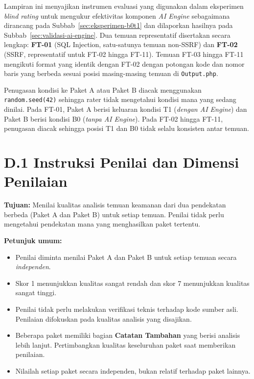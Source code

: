 {}
\label{app:blind-rating}

Lampiran ini menyajikan instrumen evaluasi yang digunakan dalam
eksperimen \textit{blind rating} untuk mengukur efektivitas komponen
\textit{AI Engine} sebagaimana dirancang pada
Subbab~\ref{sec:eksperimen-b0t1} dan dilaporkan hasilnya pada
Subbab~\ref{sec:validasi-ai-engine}. Dua temuan representatif
disertakan secara lengkap: \textbf{FT-01} (SQL Injection,
satu-satunya temuan non-SSRF) dan \textbf{FT-02} (SSRF, representatif
untuk FT-02 hingga FT-11). Temuan FT-03 hingga FT-11 mengikuti format
yang identik dengan FT-02 dengan potongan kode dan nomor baris yang
berbeda sesuai posisi masing-masing temuan di \texttt{Output.php}.

Penugasan kondisi ke Paket A atau Paket B diacak menggunakan
\texttt{random.seed(42)} sehingga rater tidak mengetahui kondisi mana
yang sedang dinilai. Pada FT-01, Paket A berisi keluaran kondisi T1
(\textit{dengan AI Engine}) dan Paket B berisi kondisi B0
(\textit{tanpa AI Engine}). Pada FT-02 hingga FT-11, penugasan
diacak sehingga posisi T1 dan B0 tidak selalu konsisten antar temuan.

\section*{D.1 Instruksi Penilai dan Dimensi Penilaian}

\textbf{Tujuan:} Menilai kualitas analisis temuan keamanan dari dua
pendekatan berbeda (Paket A dan Paket B) untuk setiap temuan.
Penilai tidak perlu mengetahui pendekatan mana yang menghasilkan
paket tertentu.

\textbf{Petunjuk umum:}
\begin{itemize}
  \item Penilai diminta menilai Paket A dan Paket B untuk setiap
  temuan secara \emph{independen}.
  \item Skor 1 menunjukkan kualitas sangat rendah dan skor 7
  menunjukkan kualitas sangat tinggi.
  \item Penilai tidak perlu melakukan verifikasi teknis terhadap
  kode sumber asli. Penilaian difokuskan pada kualitas analisis
  yang disajikan.
  \item Beberapa paket memiliki bagian \textbf{Catatan Tambahan}
  yang berisi analisis lebih lanjut. Pertimbangkan kualitas
  keseluruhan paket saat memberikan penilaian.
  \item Nilailah setiap paket secara independen, bukan relatif
  terhadap paket lainnya.
\end{itemize}

